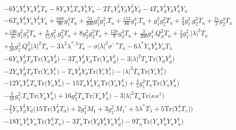 {\begin{align}
 &-6 {Y_u  Y_{u}^{\dagger}  Y_u  Y_{u}^{\dagger}  T_u} -8 {Y_u  Y_{u}^{\dagger}  T_u  Y_{u}^{\dagger}  Y_u} -2 {T_u  Y_{d}^{\dagger}  Y_d  Y_{d}^{\dagger}  Y_d} -4 {T_u  Y_{d}^{\dagger}  Y_d  Y_{u}^{\dagger}  Y_u} \nonumber \\ 
 &-6 {T_u  Y_{u}^{\dagger}  Y_u  Y_{u}^{\dagger}  Y_u} +\frac{689}{90} g_{1}^{4} T_u +\frac{53}{300} g_{1}^{2} g_{1'}^{2} T_u +\frac{153}{80} g_{1'}^{4} T_u +g_{1}^{2} g_{2}^{2} T_u +\frac{3}{4} g_{1'}^{2} g_{2}^{2} T_u +\frac{21}{2} g_{2}^{4} T_u \nonumber \\ 
 &+\frac{136}{45} g_{1}^{2} g_{3}^{2} T_u +\frac{8}{15} g_{1'}^{2} g_{3}^{2} T_u +8 g_{2}^{2} g_{3}^{2} T_u +\frac{128}{9} g_{3}^{4} T_u +\frac{3}{200} g_{1'}^{4} Q_{S}^{2} T_u +\frac{1}{4} g_{1'}^{2} |\lambda|^2 T_u \nonumber \\ 
 &+\frac{1}{20} g_{1'}^{2} Q_{S}^{2} |\lambda|^2 T_u -3 \lambda^{2} \lambda^{*,2} T_u - \sigma |\lambda|^2 \sigma^{\prime,*} T_u -6 \lambda^* {Y_u  Y_{u}^{\dagger}  Y_u} T_{\lambda} \nonumber \\ 
 &-6 {Y_u  Y_{d}^{\dagger}  T_d} \mbox{Tr}\Big({Y_d  Y_{d}^{\dagger}}\Big) -3 {T_u  Y_{d}^{\dagger}  Y_d} \mbox{Tr}\Big({Y_d  Y_{d}^{\dagger}}\Big) -3 |\lambda|^2 T_u \mbox{Tr}\Big({Y_d  Y_{d}^{\dagger}}\Big) \nonumber \\ 
 &-2 {Y_u  Y_{d}^{\dagger}  T_d} \mbox{Tr}\Big({Y_e  Y_{e}^{\dagger}}\Big) - {T_u  Y_{d}^{\dagger}  Y_d} \mbox{Tr}\Big({Y_e  Y_{e}^{\dagger}}\Big) - |\lambda|^2 T_u \mbox{Tr}\Big({Y_e  Y_{e}^{\dagger}}\Big) \nonumber \\ 
 &-12 {Y_u  Y_{u}^{\dagger}  T_u} \mbox{Tr}\Big({Y_u  Y_{u}^{\dagger}}\Big) -15 {T_u  Y_{u}^{\dagger}  Y_u} \mbox{Tr}\Big({Y_u  Y_{u}^{\dagger}}\Big) +\frac{4}{5} g_{1}^{2} T_u \mbox{Tr}\Big({Y_u  Y_{u}^{\dagger}}\Big) \nonumber \\ 
 &-\frac{3}{10} g_{1'}^{2} T_u \mbox{Tr}\Big({Y_u  Y_{u}^{\dagger}}\Big) +16 g_{3}^{2} T_u \mbox{Tr}\Big({Y_u  Y_{u}^{\dagger}}\Big) -3 |\lambda|^2 T_u \mbox{Tr}\Big({\kappa  \kappa^{\dagger}}\Big) \nonumber \\ 
 &-\frac{2}{5} {Y_u  Y_{d}^{\dagger}  Y_d} \Big(15 \mbox{Tr}\Big({Y_{d}^{\dagger}  T_d}\Big)  + 2 g_{1}^{2} M_1  + 3 g_{1'}^{2} M_1'  + 5 \lambda^* T_{\lambda}  + 5 \mbox{Tr}\Big({Y_{e}^{\dagger}  T_e}\Big) \Big)\nonumber \\ 
 &-18 {Y_u  Y_{u}^{\dagger}  Y_u} \mbox{Tr}\Big({Y_{u}^{\dagger}  T_u}\Big) -3 T_u \mbox{Tr}\Big({Y_d  Y_{u}^{\dagger}  Y_u  Y_{d}^{\dagger}}\Big) -9 T_u \mbox{Tr}\Big({Y_u  Y_{u}^{\dagger}  Y_u  Y_{u}^{\dagger}}\Big) \nonumber \\ 

\end{align}}
